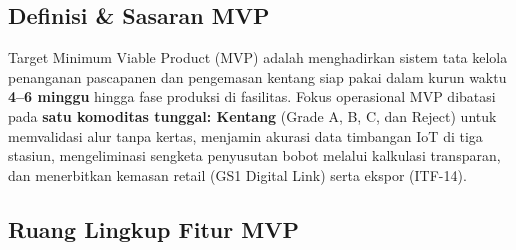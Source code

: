 \documentclass[12pt,a4paper]{article}
\begin{document}
\subsection{Definisi \& Sasaran MVP}
Target Minimum Viable Product (MVP) adalah menghadirkan sistem tata kelola penanganan pascapanen dan pengemasan kentang siap pakai dalam kurun waktu \textbf{4--6 minggu} hingga fase produksi di fasilitas. Fokus operasional MVP dibatasi pada \textbf{satu komoditas tunggal: Kentang} (Grade A, B, C, dan Reject) untuk memvalidasi alur tanpa kertas, menjamin akurasi data timbangan IoT di tiga stasiun, mengeliminasi sengketa penyusutan bobot melalui kalkulasi transparan, dan menerbitkan kemasan retail (GS1 Digital Link) serta ekspor (ITF-14).

\subsection{Ruang Lingkup Fitur MVP}
\end{document}

